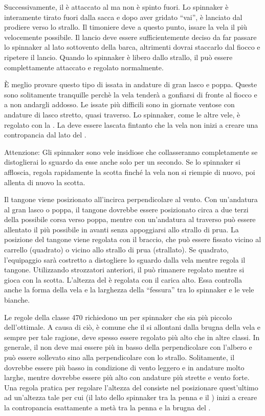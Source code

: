 Successivamente, il \pole è attaccato al \guy ma non è spinto fuori. Lo
spinnaker è interamente tirato fuori dalla sacca e dopo aver gridato ``vai'', è
lanciato dal prodiere verso lo strallo. Il timoniere deve a questo punto, issare
la vela il più velocemente possibile. Il lancio deve essere sufficientemente
deciso da far passare lo spinnaker al lato sottovento della barca, altrimenti
dovrai staccarlo dal fiocco e ripetere il lancio. Quando lo spinnaker è libero
dallo strallo, il \pole può essere complettamente attaccato e regolato
normalmente.

È meglio provare questo tipo di issata in andature di gran lasco e poppa. Queste sono
solitamente tranquille perchè la vela tenderà a gonfiarsi di fronte al fiocco e
a non andargli addosso. Le issate più difficili sono in giornate ventose con
andature di lasco stretto, quasi traverso. Lo spinnaker, come le altre vele, è
regolato con la \sheet. La \sheet deve essere lascata fintanto che la vela non
inizi a creare una contropancia dal lato del \pole.

Attenzione: Gli spinnaker sono vele insidiose che collasseranno completamente se
distoglierai lo sguardo da esse anche solo per un secondo. Se lo spinnaker si
affloscia, regola rapidamente la scotta finché la vela non si riempie di nuovo,
poi allenta di nuovo la scotta.

Il tangone viene posizionato all'incirca perpendicolare al vento. Con
un'andatura al gran lasco o poppa, il tangone dovrebbe essere posizionato circa
a due terzi della possibile corsa verso poppa, mentre con un'andatura al
traverso può essere allentato il più possibile in avanti senza appoggiarsi allo
strallo di prua. La posizione del tangone viene regolata con il braccio, che può
essere fissato vicino al carrello (quadrato) o vicino allo strallo di prua
(strallato).
%
Se quadrato, l'equipaggio sarà costretto a distogliere lo sguardo dalla vela
mentre regola il tangone. Utilizzando strozzatori anteriori, il \guy può
rimanere regolato mentre si gioca con la scotta. L'altezza del \pole è regolata
con il carica alto. Essa controlla anche la forma della vela e la larghezza
della ``fessura'' tra lo spinnaker e le vele bianche.

Le regole della classe 470 richiedono un \pole per spinnaker che sia più
piccolo dell'ottimale. A causa di ciò, è comune che il \pole si allontani dalla
brugna della vela e sempre per tale ragione, deve spesso essere regolato più
alto che in altre classi. In generale, il \pole non deve mai essere più in basso
della perpendicolare con l'albero e può essere sollevato sino alla
perpendicolare con lo strallo. Solitamente, il \pole dovrebbe essere più basso
in condizione di vento leggero e in andature molto larghe, mentre dovrebbe
essere più alto con andature più strette e vento forte.
%
Una regola pratica per regolare l'altezza del \pole consiste nel posizionare
quest'ultimo ad un'altezza tale per cui \theluff (il lato dello spinnaker tra la
penna e il \guy) inizi a creare la contropancia esattamente a metà tra la
penna e la brugna del \guy.

